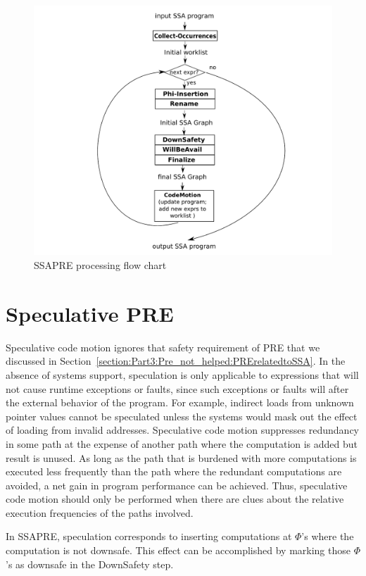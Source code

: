 \begin{figure}
\centering
\includegraphics[scale=0.45]{fig-ssapre-flow.pdf}
\caption{SSAPRE processing flow chart}
\label{fig: ssapre-flow}
\end{figure}
 
\section{Speculative PRE}

Speculative code motion ignores that safety requirement of PRE that we
discussed in Section~\ref{section:Part3:Pre_not_helped:PRErelatedtoSSA}.
In the absence of systems support, speculation is only applicable to 
expressions that will not cause runtime exceptions or faults, since such
exceptions or faults will after the external behavior of the program.  
For example, indirect loads from unknown pointer values cannot be speculated
unless the systems would mask out the effect of loading from invalid addresses.
Speculative code motion suppresses
redundancy in some path at the expense of another path where the computation 
is added but result is unused.  As long as the path that is burdened with
more computations is executed less frequently than the path where the
redundant computations are avoided, a net gain in program performance can be
achieved.  Thus, speculative code motion should only be performed when there
are clues about the relative execution frequencies of the paths involved.

In SSAPRE, speculation corresponds to inserting computations at $\Phi$'s where
the computation is not downsafe.  This effect can be accomplished by 
marking those $\Phi$'s as downsafe in the DownSafety step.


